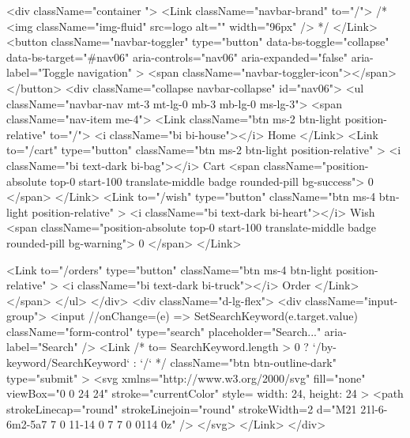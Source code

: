         <div className="container ">
          <Link className="navbar-brand" to="/">
            {/* <img className="img-fluid" src={logo} alt="" width="96px" /> */}
          </Link>
          <button
            className="navbar-toggler"
            type="button"
            data-bs-toggle="collapse"
            data-bs-target="#nav06"
            aria-controls="nav06"
            aria-expanded="false"
            aria-label="Toggle navigation"
          >
            <span className="navbar-toggler-icon"></span>
          </button>
          <div className="collapse navbar-collapse" id="nav06">
            <ul className="navbar-nav mt-3 mt-lg-0 mb-3 mb-lg-0 ms-lg-3">
              <span className="nav-item me-4">
                <Link className="btn ms-2 btn-light position-relative" to="/">
                  <i className="bi bi-house"></i> Home
                </Link>
                <Link
                  to="/cart"
                  type="button"
                  className="btn ms-2 btn-light position-relative"
                >
                  <i className="bi text-dark bi-bag"></i> Cart
                  <span className="position-absolute top-0 start-100 translate-middle badge rounded-pill bg-success">
                    {0}
                  </span>
                </Link>
                <Link
                  to="/wish"
                  type="button"
                  className="btn ms-4 btn-light position-relative"
                >
                  <i className="bi text-dark bi-heart"></i> Wish
                  <span className="position-absolute top-0 start-100 translate-middle badge rounded-pill bg-warning">
                    {0}
                  </span>
                </Link>

                <Link
                  to="/orders"
                  type="button"
                  className="btn ms-4 btn-light position-relative"
                >
                  <i className="bi text-dark  bi-truck"></i> Order
                </Link>
              </span>
            </ul>
          </div>
          <div className="d-lg-flex">
            <div className="input-group">
              <input
                //onChange={(e) => SetSearchKeyword(e.target.value)}
                className="form-control"
                type="search"
                placeholder="Search..."
                aria-label="Search"
              />
              <Link
                /*  to={
                  SearchKeyword.length > 0
                    ? `/by-keyword/{SearchKeyword}`
                    : `/`
                } */
                className="btn btn-outline-dark"
                type="submit"
              >
                <svg
                  xmlns="http://www.w3.org/2000/svg"
                  fill="none"
                  viewBox="0 0 24 24"
                  stroke="currentColor"
                  style={{ width: 24, height: 24 }}
                >
                  <path
                    strokeLinecap="round"
                    strokeLinejoin="round"
                    strokeWidth={2}
                    d="M21 21l-6-6m2-5a7 7 0 11-14 0 7 7 0 0114 0z"
                  />
                </svg>
              </Link>
            </div>

